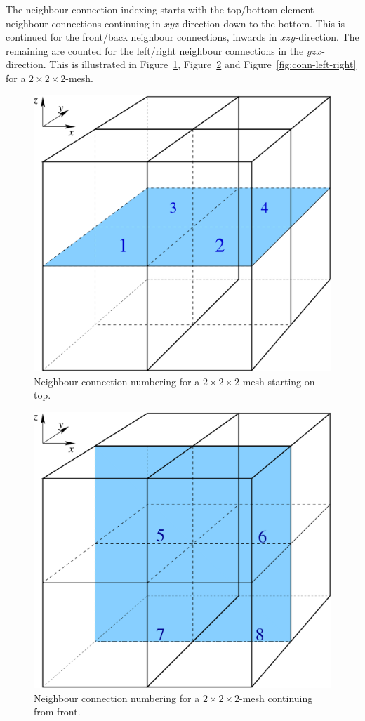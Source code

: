 The neighbour connection indexing starts with the top/bottom element
neighbour connections continuing in $xyz$-direction down to the
bottom. This is continued for the front/back neighbour connections,
inwards in $xzy$-direction. The remaining are counted for the
left/right neighbour connections in the $yzx$-direction. This is
illustrated in Figure~\ref{fig:conn-top-bottom},
Figure~\ref{fig:conn-front-back} and Figure~\ref{fig:conn-left-right}
for a $2 \times 2 \times 2$-mesh.
%
\begin{figure}
  \centering
  \includegraphics[scale=0.3]{../figures/conn-top-bottom}
  \caption{Neighbour connection numbering for a $2 \times 2 \times
    2$-mesh starting on top.}
  \label{fig:conn-top-bottom}
\end{figure}
%
\begin{figure}
  \centering
  \includegraphics[scale=0.3]{../figures/conn-front-back}
  \caption{Neighbour connection numbering for a $2 \times 2 \times
    2$-mesh continuing from front.}
  \label{fig:conn-front-back}
\end{figure}
